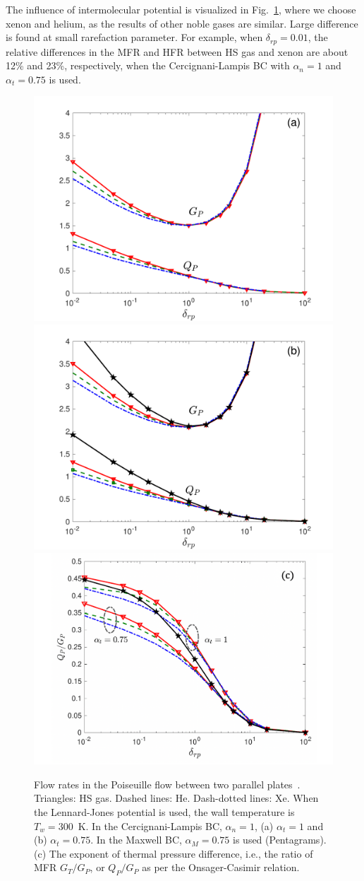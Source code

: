 The influence of intermolecular potential is visualized in Fig.~\ref{Chapter_BC_Pois1D}, where we choose xenon and helium, as the results of other noble gases are similar. Large difference is found at small rarefaction parameter. For example, when $\delta_{rp} =0.01$, the relative differences in the MFR and HFR between HS gas and xenon are about 12\% and 23\%, respectively, when the Cercignani-Lampis  BC with $\alpha _{n}=1$ and $\alpha _{t}=0.75$ is used. 




\begin{figure}[t]
	\centering
	{	\includegraphics[width=0.48\columnwidth]{LinearizedBol/IMG/BC_Fig2a}}
	{	\includegraphics[width=0.48\columnwidth]{LinearizedBol/IMG/BC_Fig2b}}\\
	\vskip 0.3cm
	{	\includegraphics[width=0.6\columnwidth]{LinearizedBol/IMG/BC_Fig2c}}
	\caption{
		Flow rates in the Poiseuille flow between two parallel plates~\cite{WuStruchtrupJFM2017}. Triangles: HS gas. Dashed lines: He. Dash-dotted lines: Xe. When the Lennard-Jones potential is used, the wall temperature is $T_w=300$~K. In the Cercignani-Lampis BC, $\alpha_n=1$,  (a) $\alpha_t=1$ and (b) $\alpha_t=0.75$. In the Maxwell BC, $\alpha_M=0.75$ is used (Pentagrams). (c) The exponent of thermal pressure difference, i.e., the ratio of MFR $G_T/G_P$, or $Q_P/G_P$ as per the Onsager-Casimir relation. 
	} 
	\label{Chapter_BC_Pois1D}
\end{figure}

